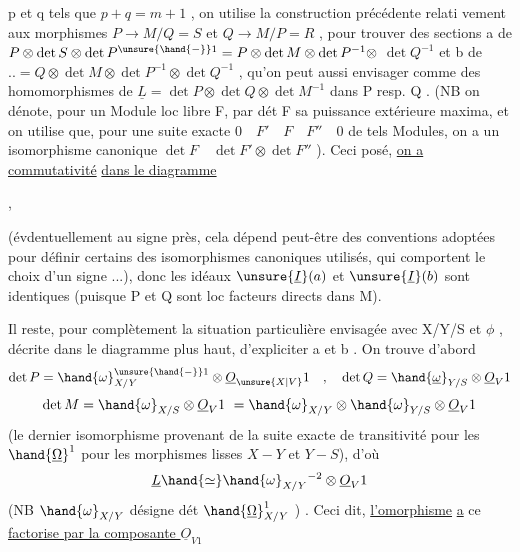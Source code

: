 
p et q tels que $p+q=m+1$ , on utilise la construction précédente relati
vement aux morphismes $P\longrightarrow M/Q = S$ et $Q\longrightarrow M/P = R$ , pour trouver
des sections  a de $P \otimes \det S \otimes \det P^{\unsure{\hand{-}}1} = P \otimes \det M \otimes \det P^{-1} \otimes$
$\det Q^{-1}$ et b de $.. = Q \otimes \det M \otimes \det P^{-1} \otimes \det Q^{-1}$ , qu'on peut
aussi envisager comme des homomorphismes de $\underline{L} = \det P \otimes \det Q \otimes \det M^{-1}$
dans P resp. Q . (NB on dénote, pour un Module loc libre F, par dét F
sa puissance extérieure maxima, et on utilise que, pour une suite
exacte $0 \quad F' \quad F \quad F'' \quad 0$ de tels Modules, on a un isomorphisme
canonique $\det F \quad \det F' \otimes \det F''$ ). Ceci posé, \uline{on a commutativité}
\uline{dans le diagramme}

,

(évdentuellement au signe près, cela dépend peut-être des conventions
adoptées pour définir certains des isomorphismes canoniques utilisés,
qui comportent le choix d'un signe ...), donc les idéaux $\unsure{\underline{I}}(a)$ et $\unsure{\underline{I}}(b)$
sont identiques (puisque P et Q sont loc facteurs directs dans M). 

Il reste, pour  complètement la situation particulière
envisagée avec X/Y/S et $\phi$ , décrite dans le diagramme  plus haut, 
d'expliciter a et b . On trouve d'abord
\[ \det P = \hand{\omega}_{X/Y}^{\unsure{\hand{-}}1} \otimes \underline{O}_{\unsure{X|V}}1 \quad , \quad \det Q = \hand{\underline{\omega}}_{Y/S} \otimes \underline{O}_{V}1 \]
\[ \det M = \hand{\omega}_{X/S} \otimes \underline{O}_{V}1 \ = \hand{\omega}_{X/Y} \otimes \hand{\omega}_{Y/S} \otimes \underline{O}_{V}1 \]
(le dernier isomorphisme provenant de la suite exacte de transitivité
pour les $\hand{\underline{\Omega}}^1$ pour les morphismes lisses $X-Y$ et $Y-S$), d'où
\[ \underline{L} \hand{\simeq} \hand{\omega}_{X/Y}{}^{-2} \otimes \underline{O}_{V}1 \]
(NB $\hand{\omega}_{X/Y}$ désigne  dét $\hand{\underline{\Omega}}^1_{X/Y}$ ) . Ceci dit, \uline{l'omorphisme} \uline{a} ce \hand{---}
\uline{factorise par la composante $\underline{O}_{V1}$}

